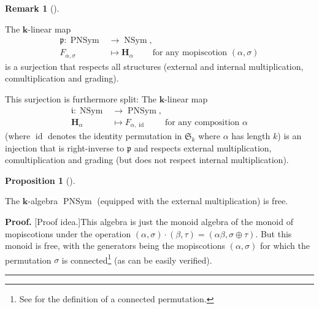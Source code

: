 \documentclass[numbers=enddot,12pt,final,onecolumn,notitlepage]{scrartcl}%
\theoremstyle{definition}
\newtheorem{prop}[theo]{Proposition}
\newenvironment{proposition}[1][]
{\begin{prop}[#1]\begin{leftbar}}
{\end{leftbar}\end{prop}}
\newtheorem{remk}[theo]{Remark}
\newenvironment{remark}[1][]
{\begin{remk}[#1]\begin{leftbar}}
{\end{leftbar}\end{remk}}
\newenvironment{proof}[1][Proof]{\noindent\textbf{#1.} }{\ \rule{0.5em}{0.5em}}
\begin{document}




\begin{remark}
\label{rmk.PNSym.p-i}The $\mathbf{k}$-linear map%
\begin{align*}
\mathfrak{p}:\operatorname*{PNSym}  &  \rightarrow\operatorname*{NSym},\\
F_{\alpha,\sigma}  &  \mapsto\mathbf{H}_{\alpha}\ \ \ \ \ \ \ \ \ \ \text{for
any mopiscotion }\left(  \alpha,\sigma\right)
\end{align*}
is a surjection that respects all structures (external and internal
multiplication, comultiplication and grading).

This surjection is furthermore split: The $\mathbf{k}$-linear map%
\begin{align*}
\mathfrak{i}:\operatorname*{NSym}  &  \rightarrow\operatorname*{PNSym},\\
\mathbf{H}_{\alpha}  &  \mapsto F_{\alpha,\operatorname*{id}}%
\ \ \ \ \ \ \ \ \ \ \text{for any composition }\alpha
\end{align*}
(where $\operatorname*{id}$ denotes the identity permutation in $\mathfrak{S}%
_{k}$ where $\alpha$ has length $k$) is an injection that is right-inverse to
$\mathfrak{p}$ and respects external multiplication, comultiplication and
grading (but does not respect internal multiplication).
\end{remark}

\begin{proposition}
The $\mathbf{k}$-algebra $\operatorname*{PNSym}$ (equipped with the external
multiplication) is free.
\end{proposition}

\begin{proof}
[Proof idea.]This algebra is just the monoid algebra of the monoid of
mopiscotions under the operation $\left(  \alpha,\sigma\right)  \cdot\left(
\beta,\tau\right)  =\left(  \alpha\beta,\sigma\oplus\tau\right)  $. But this
monoid is free, with the generators being the mopiscotions $\left(
\alpha,\sigma\right)  $ for which the permutation $\sigma$ is
connected\footnote{See \cite[Exercise 8.1.10]{GriRei} for the definition of a
connected permutation.} (as can be easily verified).
\end{proof}
\end{document}
